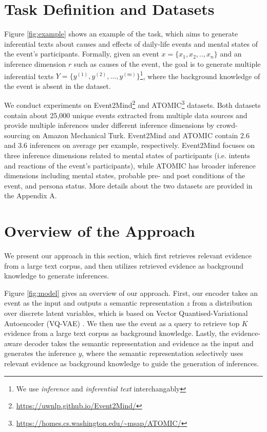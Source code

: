 \documentclass[11pt,a4paper]{article}
\begin{document}
\section{Task Definition and Datasets}
Figure \ref{fig:example} shows an example of the task, which aims to generate inferential texts about causes and effects of daily-life events and mental states of the event’s participants. Formally, given an event $x=\{x_1,x_2,..,x_n\}$ and an inference dimension $r$ such as causes of the event, the goal is to generate multiple inferential texts $Y=\{y^{(1)},y^{(2)},...,y^{(m)}\}$\footnote{We use \textit{inference} and \textit{inferential text} interchangably}, where the background knowledge of the event is absent in the dataset.

We conduct experiments on Event2Mind\footnote{\url{https://uwnlp.github.io/Event2Mind/}} \cite{rashkin2018event2mind} and ATOMIC\footnote{\url{https://homes.cs.washington.edu/~msap/ATOMIC/}} \cite{sap2019atomic} datasets.
Both datasets contain about 25,000 unique events extracted from multiple data sources and provide multiple inferences under different inference dimensions by crowd-sourcing on Amazon Mechanical Turk. Event2Mind and ATOMIC contain 2.6 and 3.6 inferences on average per example, respectively. Event2Mind focuses on three inference dimensions related to mental states of participants (i.e. intents and reactions of the event’s participants), while ATOMIC has broader inference dimensions including mental states, probable pre- and post conditions of the event, and persona status.
More details about the two datasets are provided in the Appendix A. 




\section{Overview of the Approach}
We present our approach in this section, which first retrieves relevant evidence from a large text corpus, and then utilizes retrieved evidence as background knowledge to generate inferences.

Figure \ref{fig:model} gives an overview of our approach. 
First, our encoder takes an event as the input and outputs a semantic representation $z$ from a distribution over discrete latent variables, which is based on Vector Quantised-Variational Autoencoder (VQ-VAE) \cite{van2017neural}.
We then use the event as a query to retrieve top $K$ evidence from a large text corpus as background knowledge.
Lastly, the evidence-aware decoder takes the semantic representation and evidence as the input and generates the inference $y$, where the semantic representation selectively uses relevant evidence as background knowledge to guide the generation of inferences. 
\end{document}
